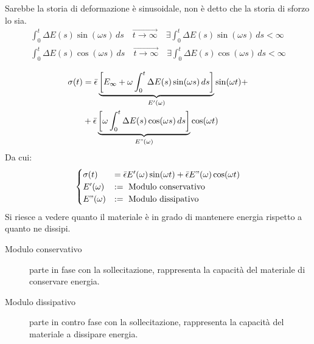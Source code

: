 Sarebbe la storia di deformazione è sinusoidale, non è detto che la storia di sforzo lo sia.
\begin{equation}
\begin{split}
\int_0^t{\Delta E(s)\sin(\omega s)\,ds} \quad \overrightarrow{t \rightarrow \infty} \quad \exists \int_0^t{\Delta E(s)\sin(\omega s)\,ds} < \infty\\
\int_0^t{\Delta E(s)\cos(\omega s)\,ds} \quad \overrightarrow{t \rightarrow \infty} \quad \exists \int_0^t{\Delta E(s)\cos(\omega s)\,ds} < \infty\\
\end{split}
\end{equation}
\begin{equation}
\begin{split}
\sigma(t) &= \bar{\epsilon}\underbrace{\left[E_{\infty} + \omega\int_0^t{\Delta E(s)\sin(\omega s)\,ds}\right]}_{E'(\omega)}\sin(\omega t) +\\
&+\bar{\epsilon}\underbrace{\left[\omega\int_0^t{\Delta E(s)\cos(\omega s)\,ds}\right]}_{E"(\omega)}\cos(\omega t)
\end{split}
\end{equation}
Da cui:
\begin{equation}
\begin{cases}
\sigma(t) &= \bar{\epsilon} E'(\omega)\sin(\omega t) + \bar{\epsilon} E"(\omega)\cos(\omega t)\\
E'(\omega) &:=\textup{ Modulo conservativo}\\
E"(\omega) &:=\textup{ Modulo dissipativo}
\end{cases}
\end{equation}
Si riesce a vedere quanto il materiale è in grado di mantenere energia rispetto a quanto ne dissipi.

\begin{description}
\item[Modulo conservativo] parte in fase con la sollecitazione, rappresenta la capacità del materiale di conservare energia.
\item[Modulo dissipativo] parte in contro fase con la sollecitazione, rappresenta la capacità del materiale a dissipare energia. 
\end{description}

